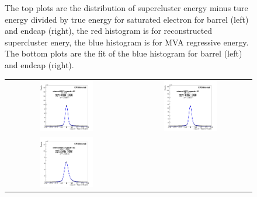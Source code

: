 \begin{figure}[bh]
\begin{center}
\begin{tabular}{cc}
    \end{tabular}
    \caption{ The top plots are the distribution of supercluster energy minus ture energy divided by true energy for saturated electron for barrel (left) and endcap (right), the red histogram is for reconstructed supercluster enery, the blue histogram is for MVA regressive energy. The bottom plots are the fit of the blue histogram for barrel (left) and endcap (right).}
    \label{fig:result_B_E}
  \end{center}
\end{figure}



\begin{figure}[bh]
  \begin{center}
    \begin{tabular}{cc}
      \includegraphics[width=0.45\textwidth]{chapters/Zprime/Saturation/images/FlatPt/Result/Barrel123_Endcap12/fit_BDTG_Barrel123_Endcap12_eta1_reg_s.png} &
      \includegraphics[width=0.45\textwidth]{chapters/Zprime/Saturation/images/FlatPt/Result/Barrel123_Endcap12/fit_BDTG_Barrel123_Endcap12_eta2_reg_s.png} \\
      \includegraphics[width=0.45\textwidth]{chapters/Zprime/Saturation/images/FlatPt/Result/Barrel123_Endcap12/fit_BDTG_Barrel123_Endcap12_eta3_reg_s.png} &

\end{tabular}
\end{center}
\end{figure}
